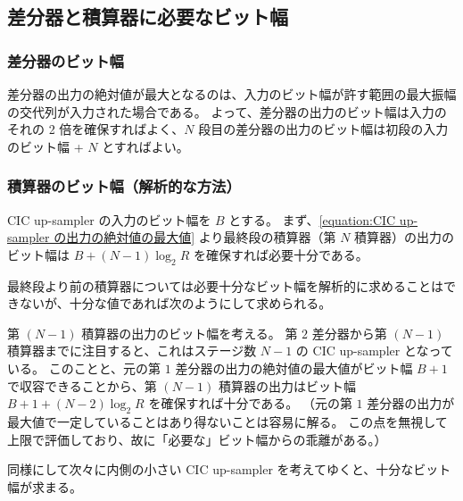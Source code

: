     \subsection{差分器と積算器に必要なビット幅}
        \subsubsection{差分器のビット幅}
            差分器の出力の絶対値が最大となるのは、入力のビット幅が許す範囲の最大振幅の交代列が入力された場合である。
            よって、差分器の出力のビット幅は入力のそれの 2 倍を確保すればよく、$N$ 段目の差分器の出力のビット幅は初段の入力のビット幅 + $N$ とすればよい。
        \subsubsection{積算器のビット幅（解析的な方法）}
            CIC up-sampler の入力のビット幅を $B$ とする。
            まず、\cref{equation:CIC up-sampler の出力の絶対値の最大値} より最終段の積算器（第 $N$ 積算器）の出力のビット幅は $B + (N-1)\log_2 R$ を確保すれば必要十分である。
            \par
            最終段より前の積算器については必要十分なビット幅を解析的に求めることはできないが、十分な値であれば次のようにして求められる。
            \par
            第 $(N-1)$ 積算器の出力のビット幅を考える。
            第 $2$ 差分器から第 $(N-1)$ 積算器までに注目すると、これはステージ数 $N-1$ の CIC up-sampler となっている。
            このことと、元の第 $1$ 差分器の出力の絶対値の最大値がビット幅 $B+1$ で収容できることから、第 $(N-1)$ 積算器の出力はビット幅 $B + 1 + (N-2)\log_2 R$ を確保すれば十分である。
            （元の第 $1$ 差分器の出力が最大値で一定していることはあり得ないことは容易に解る。
            この点を無視して上限で評価しており、故に「必要な」ビット幅からの乖離がある。）
            \par
            同様にして次々に内側の小さい CIC up-sampler を考えてゆくと、十分なビット幅が求まる。
